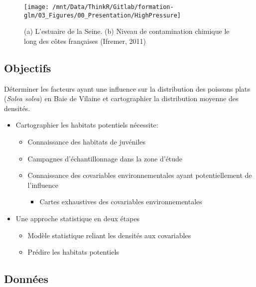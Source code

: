 \documentclass[french,a4paper]{article}
\providecommand{\tightlist}{%
  \setlength{\itemsep}{0pt}\setlength{\parskip}{0pt}}
\begin{document}
\begin{figure}[!h]

{\centering \texttt{[image: /mnt/Data/ThinkR/Gitlab/formation-glm/03\_Figures/00\_Presentation/HighPressure]} 

}

\caption{(a) L'estuaire de la Seine. (b) Niveau de
contamination chimique le long des côtes françaises (Ifremer, 2011)}\label{fig:figHighPressure}
\end{figure}

\subsection{Objectifs}\label{objectifs}

Déterminer les facteurs ayant une influence sur la distribution des
poissons plats (\emph{Solea solea}) en Baie de Vilaine et cartographier
la distribution moyenne des densités.

\begin{itemize}
\tightlist
\item
  Cartographier les habitats potentiels nécessite:

  \begin{itemize}
  \tightlist
  \item
    Connaissance des habitats de juvéniles
  \item
    Campagnes d'échantillonnage dans la zone d'étude
  \item
    Connaissance des covariables environnementales ayant potentiellement
    de l'influence

    \begin{itemize}
    \tightlist
    \item
      Cartes exhaustives des covariables environnementales
    \end{itemize}
  \end{itemize}
\item
  Une approche statistique en deux étapes

  \begin{itemize}
  \tightlist
  \item
    Modèle statistique reliant les densités aux covariables
  \item
    Prédire les habitats potentiels
  \end{itemize}
\end{itemize}

\subsection{Données}\label{donnees}
\end{document}
